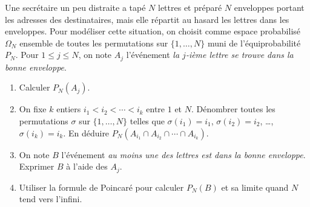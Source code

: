 \documentclass[a4paper,12pt,reqno]{amsart}
\begin{document}
\begin{exo}

  Une secrétaire un peu distraite a tapé $ N $ lettres et préparé $ N $ enveloppes portant les adresses des destinataires, mais elle répartit au hasard les lettres dans les enveloppes. Pour modéliser cette situation, on choisit comme espace probabilisé $ \Omega_N $ ensemble de toutes les permutations sur $ \{ 1,\ldots,N \} $ muni de l'équiprobabilité $ P_N $. Pour $ 1 \le j \le N $, on note $ A_j $ l'événement \emph{la $ j$-ième lettre se trouve dans la bonne enveloppe}.
  \begin{enumerate}
    \item Calculer $ P_N(A_j) $.

    \item On fixe $ k $ entiers $ i_1 < i_2 < \cdots < i_k $ entre $ 1 $ et $ N $. Dénombrer toutes les permutations $ \sigma $ sur $ \{1,\ldots,N\} $ telles que $ \sigma(i_1)=i_1 $, $ \sigma(i_2)=i_2 $, \ldots, $ \sigma(i_k)=i_k $. En déduire $ P_N(  A_{i_1} \cap A_{i_2} \cap \cdots \cap A_{i_k} ) $.

    \item On note $ B $ l'événement \emph{au moins une des lettres est dans la bonne enveloppe}. Exprimer $ B $ à l'aide des $ A_j $.

    \item Utiliser la formule de Poincaré pour calculer $ P_N(B) $ et sa limite quand $ N $ tend vers l'infini.
  \end{enumerate}

\end{exo}
\end{document}
